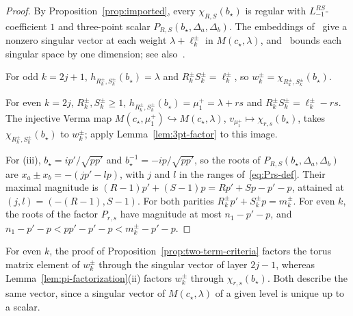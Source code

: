 \documentclass[twoside,10pt]{article}
\numberwithin{equation}{section}
\theoremstyle{slbody}
\theoremstyle{definition}
\theoremstyle{remark}
\begin{document}
\begin{proof}
By Proposition~\ref{prop:imported}, every \(\chi_{R,S}(b_\star)\) is regular
with \(L_{-1}^{RS}\)-coefficient \(1\) and three-point scalar
\(P_{R,S}(b_\star,\Delta_a,\Delta_b)\).  The embeddings
of~\cite[Proposition~5.4 and Figure~5.4]{IoharaKoga2011} give a nonzero
singular vector at each weight \(\lambda+\ell^\pm_k\) in \(M(c_\star,\lambda)\),
and~\cite[Proposition~5.1]{IoharaKoga2011} bounds each singular space by one
dimension; see also~\cite[Theorem~3.1]{Astashkevich1997}.

For odd \(k=2j+1\), \(h_{R^\pm_k,S^\pm_k}(b_\star)=\lambda\) and
\(R^\pm_kS^\pm_k=\ell^\pm_k\), so \(w^\pm_k=\chi_{R^\pm_k,S^\pm_k}(b_\star)\).

For even \(k=2j\), \(R^\pm_k,S^\pm_k\geq1\),
\(h_{R^\pm_k,S^\pm_k}(b_\star)=\mu^+_1=\lambda+rs\) and
\(R^\pm_kS^\pm_k=\ell^\pm_k-rs\).  The injective Verma map
\(M(c_\star,\mu^+_1)\hookrightarrow M(c_\star,\lambda)\),
\(v_{\mu^+_1}\mapsto\chi_{r,s}(b_\star)\), takes
\(\chi_{R^\pm_k,S^\pm_k}(b_\star)\) to \(w^\pm_k\); apply
Lemma~\ref{lem:3pt-factor} to this image.

For (iii), \(b_\star=ip'/\sqrt{pp'}\) and \(b_\star^{-1}=-ip/\sqrt{pp'}\), so
the roots of \(P_{R,S}(b_\star,\Delta_a,\Delta_b)\) are
\(x_a\pm x_b=-(jp'-lp)\), with \(j\) and \(l\) in the ranges
of~\eqref{eq:Prs-def}.  Their maximal magnitude is
\((R-1)p'+(S-1)p=Rp'+Sp-p'-p\), attained at \((j,l)=(-(R-1),S-1)\).  For both
parities \(R^\pm_kp'+S^\pm_kp=m^\pm_k\).  For even \(k\), the roots of the
factor \(P_{r,s}\) have magnitude at most \(n_1-p'-p\), and
\(n_1-p'-p<pp'-p'-p<m^\pm_k-p'-p\).
\end{proof}

For even \(k\), the proof of Proposition~\ref{prop:two-term-criteria} factors
the torus matrix element of \(w^\pm_k\) through the singular vector of layer
\(2j-1\), whereas
Lemma~\ref{lem:pi-factorization}(ii) factors \(w^\pm_k\) through
\(\chi_{r,s}(b_\star)\).  Both describe the same vector, since a singular
vector of \(M(c_\star,\lambda)\) of a given level is unique up to a scalar.
\end{document}
